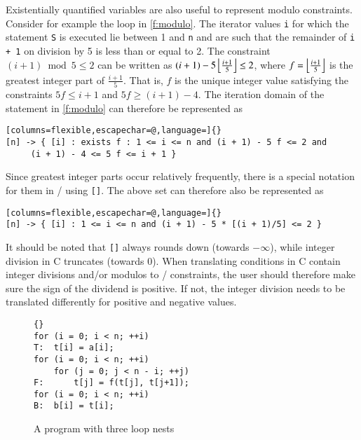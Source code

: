 Existentially quantified variables are also useful to represent
modulo constraints.  Consider for example the loop in
\autoref{f:modulo}.  The iterator values \lstinline!i! for which
the statement \lstinline!S! is executed lie between
1 and \lstinline!n! and are such that the remainder of
\lstinline!i + 1! on division by 5 is less than or equal to 2.
The constraint $(i + 1) \bmod 5 \le 2$ can be written
as $(i + 1) - 5 \left\lfloor\frac{i+1}5\right\rfloor \le 2$, where
$f = \left\lfloor\frac{i+1}5\right\rfloor$ is the greatest integer part of $\frac{i+1}5$.
That is, $f$ is the unique integer value satisfying the constraints
$5 f \le i + 1$ and $5 f \ge (i+1) - 4$.
The iteration domain of the statement in \autoref{f:modulo}
can therefore be represented as
\begin{lstlisting}[columns=flexible,escapechar=@,language=]{}
[n] -> { [i] : exists f : 1 <= i <= n and (i + 1) - 5 f <= 2 and
	 (i + 1) - 4 <= 5 f <= i + 1 }
\end{lstlisting}
Since greatest integer parts occur relatively frequently, there is
a special notation for them in \isl/ using \lstinline![]!.
The above set can therefore also be represented as
\begin{lstlisting}[columns=flexible,escapechar=@,language=]{}
[n] -> { [i] : 1 <= i <= n and (i + 1) - 5 * [(i + 1)/5] <= 2 }
\end{lstlisting}
It should be noted that \lstinline![]! always rounds down
(towards $-\infty$), while integer division in C truncates
(towards 0).  When translating conditions in C contain integer
divisions and/or modulos to \isl/ constraints, the user should therefore
make sure the sign of the dividend is positive.  If not, the integer
division needs to be translated differently for positive and negative
values.

\begin{figure}
\begin{lstlisting}[escapechar=@]{}
for (i = 0; i < n; ++i)
T:  t[i] = a[i];
for (i = 0; i < n; ++i)
    for (j = 0; j < n - i; ++j)
F:      t[j] = f(t[j], t[j+1]);
for (i = 0; i < n; ++i)
B:  b[i] = t[i];
\end{lstlisting}
\caption{A program with three loop nests}
\label{f:three loops}
\end{figure}

